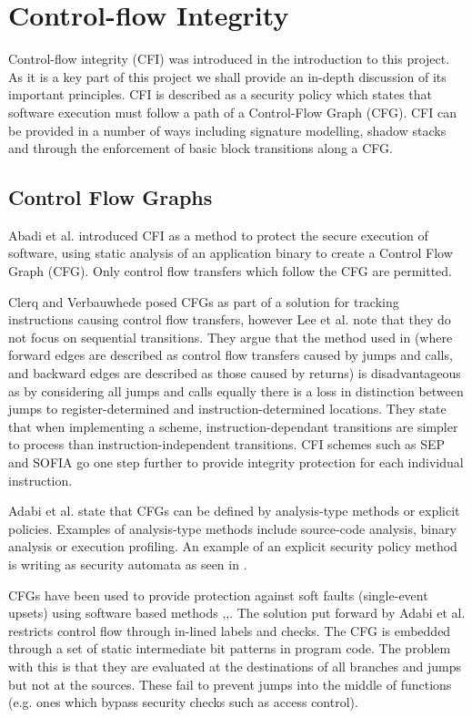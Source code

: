 \section{Control-flow Integrity}

Control-flow integrity (CFI) was introduced in the introduction to this project. As it is a key part of this project we shall provide an in-depth discussion of its important principles. CFI is described as a security policy which states that software execution must follow a path of a Control-Flow Graph (CFG). CFI can be provided in a number of ways including signature modelling, shadow stacks and through the enforcement of basic block transitions along a CFG.

\subsection{Control Flow Graphs}
Abadi et al. \cite{Abadi2005} introduced CFI as a method to protect the secure execution of software, using static analysis of an application binary to create a Control Flow Graph (CFG). Only control flow transfers which follow the CFG are permitted.

Clerq and Verbauwhede \cite{DeClercq2017} posed CFGs as part of a solution for tracking instructions causing control flow transfers, however Lee et al. \cite{Lee2019} note that they do not focus on sequential transitions. They argue that the method used in \cite{DeClercq2017} (where forward edges are described as control flow transfers caused by jumps and calls, and backward edges are described as those caused by returns) is disadvantageous as by considering all jumps and calls equally there is a loss in distinction between jumps to register-determined and instruction-determined locations. They state that when implementing a scheme, instruction-dependant transitions are simpler to process than instruction-independent transitions. CFI schemes such as SEP \cite{Lee2019} and SOFIA \cite{DeClercq2017b} go one step further to provide integrity protection for each individual instruction.

Adabi et al. \cite{Abadi2005} state that CFGs can be defined by analysis-type methods or explicit policies. Examples of analysis-type methods include source-code analysis, binary analysis or execution profiling. An example of an explicit security policy method is writing as security automata as seen in \cite{Erlingsson2004}. 
\ifnotesincluded
{}
\fi

CFGs have been used to provide protection against soft faults (single-event upsets) using software based methods \cite{Oh2002},\cite{Sharma2012},\cite{Venkatasubramanian2003}. 
The solution put forward by Adabi et al. \cite{Abadi2005} restricts control flow through in-lined labels and checks. The CFG is embedded through a set of static intermediate bit patterns in program code. The problem with this is that they are evaluated at the destinations of all branches and jumps but not at the sources. These fail to prevent jumps into the middle of functions (e.g. ones which bypass security checks such as access control).

